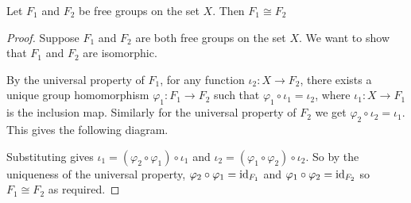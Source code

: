 \begin{theorem}
    Let $F_1$ and $F_2$ be free groups on the set $X$. Then $F_1 \cong F_2$
\end{theorem}

\begin{proof}
    Suppose \( F_1 \) and \( F_2 \) are both free groups on the set \( X \). We want to show that \( F_1 \) and \( F_2 \) are isomorphic.

By the universal property of $F_1$, for any function $\iota_2: X \to F_2$, there exists a unique group homomorphism $\varphi_1: F_1 \to F_2$ such that $\varphi_1 \circ \iota_1 = \iota_2$, where $\iota_1: X \to F_1$ is the inclusion map. Similarly for the universal property of $F_2$ we get $\varphi_2 \circ \iota_2 = \iota_1$. This gives the following diagram.

\begin{center}
\end{center}

Substituting gives $\iota_1 = (\varphi_2 \circ \varphi_1) \circ \iota_1$ and $\iota_2 = (\varphi_1 \circ \varphi_2) \circ \iota_2$. So by the uniqueness of the universal property, $\varphi_2 \circ \varphi_1 = \mathrm{id}_{F_1}$ and $\varphi_1 \circ \varphi_2 = \mathrm{id}_{F_2}$ so $F_1 \cong F_2$ as required. 
\end{proof}



